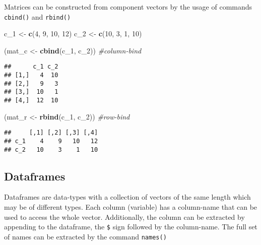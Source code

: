 \documentclass[11pt,]{article}
\newenvironment{Shaded}{\begin{snugshade}}{\end{snugshade}}
\newcommand{\KeywordTok}[1]{\textcolor[rgb]{0.13,0.29,0.53}{\textbf{#1}}}
\newcommand{\DecValTok}[1]{\textcolor[rgb]{0.00,0.00,0.81}{#1}}
\newcommand{\StringTok}[1]{\textcolor[rgb]{0.31,0.60,0.02}{#1}}
\newcommand{\CommentTok}[1]{\textcolor[rgb]{0.56,0.35,0.01}{\textit{#1}}}
\newcommand{\NormalTok}[1]{#1}
\begin{document}
Matrices can be constructed from component vectors by the usage of
commands \texttt{cbind()} and \texttt{rbind()}

\begin{Shaded}
\begin{Highlighting}[]
\NormalTok{c_}\DecValTok{1}\NormalTok{ <-}\StringTok{ }\KeywordTok{c}\NormalTok{(}\DecValTok{4}\NormalTok{, }\DecValTok{9}\NormalTok{, }\DecValTok{10}\NormalTok{, }\DecValTok{12}\NormalTok{)}
\NormalTok{c_}\DecValTok{2}\NormalTok{ <-}\StringTok{ }\KeywordTok{c}\NormalTok{(}\DecValTok{10}\NormalTok{, }\DecValTok{3}\NormalTok{, }\DecValTok{1}\NormalTok{, }\DecValTok{10}\NormalTok{)}

\NormalTok{(mat_c <-}\StringTok{ }\KeywordTok{cbind}\NormalTok{(c_}\DecValTok{1}\NormalTok{, c_}\DecValTok{2}\NormalTok{)) }\CommentTok{#column-bind}
\end{Highlighting}
\end{Shaded}

\begin{verbatim}
##      c_1 c_2
## [1,]   4  10
## [2,]   9   3
## [3,]  10   1
## [4,]  12  10
\end{verbatim}

\begin{Shaded}
\begin{Highlighting}[]
\NormalTok{(mat_r <-}\StringTok{ }\KeywordTok{rbind}\NormalTok{(c_}\DecValTok{1}\NormalTok{, c_}\DecValTok{2}\NormalTok{)) }\CommentTok{#row-bind}
\end{Highlighting}
\end{Shaded}

\begin{verbatim}
##     [,1] [,2] [,3] [,4]
## c_1    4    9   10   12
## c_2   10    3    1   10
\end{verbatim}

\subsection{Dataframes}\label{dataframes}

Dataframes are data-types with a collection of vectors of the same
length which may be of different types. Each column (variable) has a
column-name that can be used to access the whole vector. Additionally,
the column can be extracted by appending to the dataframe, the
\texttt{\$} sign followed by the column-name. The full set of names can
be extracted by the command \texttt{names()}
\end{document}
